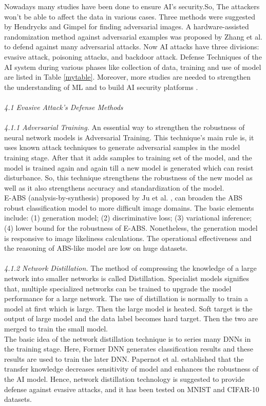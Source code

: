 \documentclass{article}
\begin{document}
	Nowadays many studies have been done to ensure AI’s security.So, The attackers won’t be able to affect the data in various cases. Three methods were suggested by Hendrycks and Gimpel \cite{hendrycks2016early} for finding adversarial images. A hardware-assisted randomization method against adversarial examples was proposed by Zhang et al. \cite{zhang2020hrae} to defend against many adversarial attacks. Now AI attacks have three divisions: evasive attack, poisoning attacks, and backdoor attack. Defense Techniques of the AI system during various phases like collection of data, training and use of model are listed in Table \ref{mytable}. Moreover, more studies are needed to strengthen the understanding of ML and to build AI security platforms \cite{kong2021survey}.
	\\\\
	\textit{4.1 Evasive Attack’s Defense Methods}
	\\\\
	\textit{4.1.1 Adversarial Training.}
	An essential way to strengthen the robustness of neural network models is Adversarial Training. This technique’s main rule is, it uses known attack techniques to generate adversarial samples in the model training stage. After that it adds samples to training set of the model, and the model is trained again and again till a new model is generated which can resist disturbance. So, this technique strengthens the robustness of the new model as well as it also strengthens accuracy and standardization of the model.
	\\
	E-ABS (analysis-by-synthesis) proposed by Ju et al. \cite{ju2020abs}, can broaden the ABS robust classification model to more difficult image domains. The basic elements include: (1) generation model; (2) discriminative loss; (3) variational inference; (4) lower bound for the robustness of E-ABS. Nonetheless, the generation model is responsive to image likeliness calculations. The operational effectiveness and the reasoning of ABS-like model are low on huge datasets.
	\\\\
	\textit{4.1.2 Network Distillation.}
	The method of compressing the knowledge of a large network into smaller networks is called Distillation. Specialist models signifies that, multiple specialized networks can be trained to upgrade the model performance for a large network. The use of distillation is normally to train a model at first which is large.  Then the large model is heated. Soft target is the output of large model and the data label becomes hard target. Then the two are merged to train the small model.
	\\
	The basic idea of the network distillation technique is to series many DNNs in the training stage. Here, Former DNN generates classification results and these results are used to train the later DNN. Papernot et al. \cite{papernot2016distillation} established that the transfer knowledge decreases sensitivity of model and enhances the robustness of the AI model. Hence, network distillation technology is suggested to provide defense against evasive attacks, and it has been tested on MNIST and CIFAR-10 datasets.
	
\end{document}
